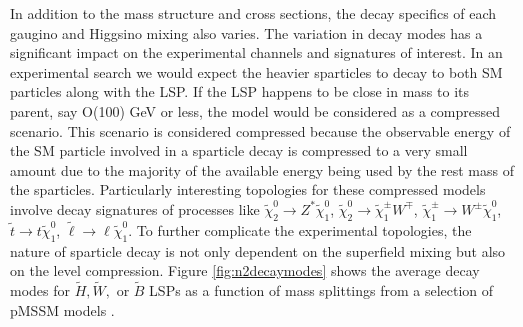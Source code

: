 

In addition to the mass structure and cross sections, the decay specifics of each gaugino and Higgsino mixing also varies. The variation in decay modes has a significant impact on the experimental channels and signatures of interest. In an experimental search we would expect the heavier sparticles to decay to both SM particles along with the LSP. If the LSP happens to be close in mass to its parent, say O(100) GeV or less, the model would be considered as a compressed scenario. This scenario is considered compressed because the observable energy of the SM particle involved in a sparticle decay is compressed to a very small amount due to the majority of the available energy being used by the rest mass of the sparticles.  Particularly interesting topologies for these compressed models involve decay signatures of processes like $\tilde{\chi}^0_2 \rightarrow Z^*\tilde{\chi}^0_1 $, $\tilde{\chi}^0_2\rightarrow \tilde{\chi}^\pm_1 W^\mp $, $\tilde{\chi}^\pm_1\rightarrow W^\pm \tilde{\chi}^0_1$, $\tilde{t}\rightarrow t \tilde{\chi}^0_1$, $\tilde{\ell}\rightarrow\ell \tilde{\chi}^0_1$. To further complicate the experimental topologies, the nature of sparticle decay is not only dependent on the superfield mixing but also on the level compression. Figure \ref{fig:n2decaymodes} shows the average decay modes for $\tilde{H}, \tilde{W},$ or $\tilde{B}$ LSPs as a function of mass splittings from a selection of pMSSM models \cite{ATLAS:2015wrn}.



